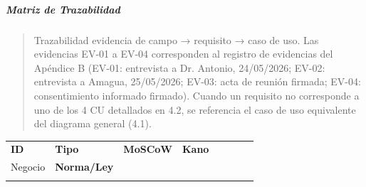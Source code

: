 \documentclass[
]{article}
\newcounter{none} %
\begin{document}
\subparagraph{Matriz de Trazabilidad}\label{matriz-de-trazabilidad}

\begin{quote}
Trazabilidad evidencia de campo → requisito → caso de uso. Las
evidencias EV-01 a EV-04 corresponden al registro de evidencias del
Apéndice B (EV-01: entrevista a Dr. Antonio, 24/05/2026; EV-02:
entrevista a Amagua, 25/05/2026; EV-03: acta de reunión firmada; EV-04:
consentimiento informado firmado). Cuando un requisito no corresponde a
uno de los 4 CU detallados en 4.2, se referencia el caso de uso
equivalente del diagrama general (4.1).
\end{quote}

{\def\LTcaptype{none} %
\begin{longtable}[]{@{}
  >{\raggedright\arraybackslash}p{}
  >{\raggedright\arraybackslash}p{}
  >{\raggedright\arraybackslash}p{}
  >{\raggedright\arraybackslash}p{}
  >{\raggedright\arraybackslash}p{}
  >{\raggedright\arraybackslash}p{}
  >{\raggedright\arraybackslash}p{}
  >{\raggedright\arraybackslash}p{}@{}}
\toprule\noalign{}
\begin{minipage}[b]{\linewidth}\raggedright
\textbf{ID}
\end{minipage} & \begin{minipage}[b]{\linewidth}\raggedright
\textbf{Tipo}
\end{minipage} & \begin{minipage}[b]{\linewidth}\raggedright
\textbf{MoSCoW}
\end{minipage} & \begin{minipage}[b]{\linewidth}\raggedright
\textbf{Kano}
\end{minipage} & \begin{minipage}[b]{\linewidth}\raggedright
\textbf{Valor\\
Negocio}\strut
\end{minipage} & \begin{minipage}[b]{\linewidth}\raggedright
\textbf{Norma/Ley}
\end{minipage} & \begin{minipage}[b]{\linewidth}\raggedright
\textbf{Caso de\\
}
\end{minipage}
\end{longtable}}
\end{document}
